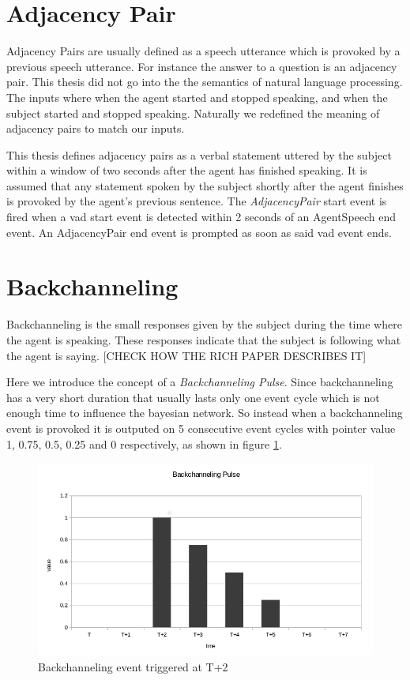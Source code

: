\documentclass[12pt, a4paper, fleqn]{memoir}%
\begin{document}
\section{Adjacency Pair}
\label{sec:AdjacencyPair}
Adjacency Pairs are usually defined as a speech utterance which is provoked by a previous speech utterance. For instance the answer to a question is an adjacency pair. This thesis did not go into the the semantics of natural language processing. The inputs where when the agent started and stopped speaking, and when the subject started and stopped speaking. Naturally we redefined the meaning of adjacency pairs to match our inputs.

This thesis defines adjacency pairs as a verbal statement uttered by the subject within a window of two seconds after the agent has finished speaking. It is assumed that any statement spoken by the subject shortly after the agent finishes is provoked by the agent's previous sentence. The \textit{AdjacencyPair} start event is fired when a vad start event is detected within 2 seconds of an AgentSpeech end event. An AdjacencyPair end event is prompted as soon as said vad event ends.

\section{Backchanneling}
\label{sec:Backchanneling}
Backchanneling is the small responses given by the subject during the time where the agent is speaking. These responses indicate that the subject is following what the agent is saying. [CHECK HOW THE RICH PAPER DESCRIBES IT]

Here we introduce the concept of a \textit{Backchanneling Pulse}. Since backchanneling has a very short duration that usually lasts only one event cycle which is not enough time to influence the bayesian network. So instead when a backchanneling event is provoked it is outputed on 5 consecutive event cycles with pointer value 1, 0.75, 0.5, 0.25 and 0 respectively, as shown in figure \ref{fig:bcp_img}.

\begin{figure}[h]
    \centering
    \includegraphics[width=1\textwidth]{bcp}
    \caption{Backchanneling event triggered at T+2}
    \label{fig:bcp_img}
\end{figure}
\end{document}
